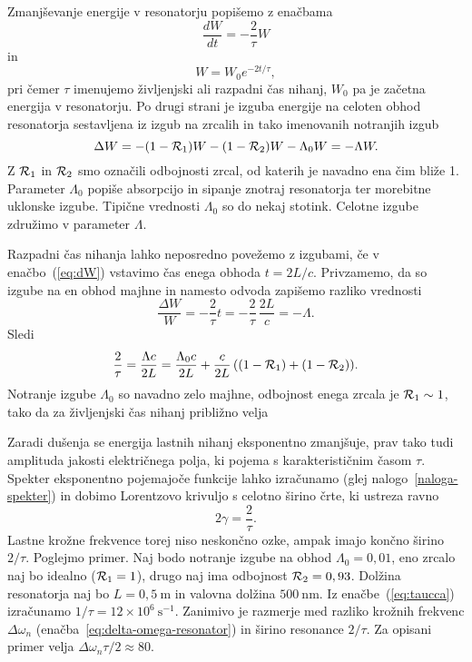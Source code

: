 Zmanjševanje energije v resonatorju popišemo z enačbama 
\begin{equation}
\frac{dW}{dt}=-\frac{2}{\tau}W
\label{eq:dW}
\end{equation}
in 
\begin{equation}
W = W_0 e^{-2t/\tau},
\label{eq:dW1}
\end{equation}
pri čemer $\tau$ imenujemo življenjski ali razpadni čas nihanj,
$W_0$ pa je začetna energija v resonatorju.
Po drugi strani je izguba energije na celoten obhod resonatorja 
sestavljena iz izgub na zrcalih in tako imenovanih notranjih izgub
\begin{equation}
\Delta W = -(1-{\cal R}_{1})W-(1-{\cal R}_{2})W -\Lambda_{0} W = -\Lambda W.
\label{eq:Lambda}
\end{equation}
Z ${\cal R}_{1}$ in ${\cal R}_{2}$ smo označili odbojnosti zrcal, od katerih je navadno ena
čim bliže 1. Parameter $\Lambda_{0}$ popiše absorpcijo in
sipanje znotraj resonatorja ter morebitne uklonske izgube. Tipične vrednosti 
$\Lambda_0$ so do nekaj stotink. Celotne izgube združimo v parameter $\Lambda$. 

Razpadni čas nihanja lahko neposredno povežemo z izgubami, če v enačbo~(\ref{eq:dW})
vstavimo čas enega obhoda $t=2L/c$. Privzamemo, da so izgube na en obhod majhne in namesto 
odvoda zapišemo razliko vrednosti
\begin{equation}
\frac{\Delta W}{W}= -\frac{2}{\tau} t = -\frac{2}{\tau}\, \frac{2L}{c} = -\Lambda.
\end{equation}
Sledi
\begin{equation}
\frac{2}{\tau}=\frac{\Lambda c}{2L}=\frac{\Lambda_0c}{2L}+\frac{c}{2L}\left((1-{\cal R}_{1})
+(1-{\cal R}_{2})\right)\!.
\label{taulambda}
\end{equation}
Notranje izgube $\Lambda_0$ so navadno zelo majhne, 
odbojnost enega zrcala je ${\cal R}_{1} \sim 1$, tako da za življenjski čas 
nihanj približno velja

Zaradi dušenja se energija lastnih nihanj eksponentno zmanjšuje, prav tako tudi
amplituda jakosti električnega polja, ki pojema s karakterističnim časom $\tau$. 
Spekter eksponentno pojemajoče funkcije lahko izračunamo
(glej nalogo~\ref{naloga-spekter}) in dobimo Lorentzovo krivuljo 
s celotno širino črte, ki ustreza ravno
\begin{equation}
2\gamma=\frac{2}{\tau}.
\label{3.26}
\end{equation}
Lastne krožne frekvence torej niso neskončno ozke, ampak imajo končno širino $2/\tau$.
Poglejmo primer. Naj bodo notranje izgube na obhod $\Lambda_0=0,01$,
eno zrcalo naj bo idealno  (${\cal R}_1=1$), drugo naj ima odbojnost ${\cal R}_2=0,93$. Dolžina
resonatorja naj bo $L=0,5~\si{\metre}$ in valovna dolžina $500~\si{\nano\metre}$. Iz enačbe~(\ref{eq:taucca}) izračunamo $1/\tau=12\times10^{6}~\si{\second}^{-1}$. 
Zanimivo je razmerje med 
razliko krožnih frekvenc $\Delta \omega_n$ 
(enačba~\ref{eq:delta-omega-resonator}) in širino resonance $2/\tau$. 
Za opisani primer velja $\Delta\omega_n\tau/2 \approx 80$.

